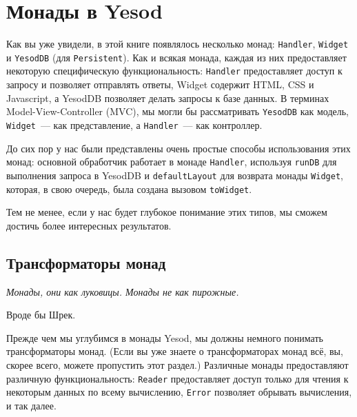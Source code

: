 \chapter{Монады в Yesod}\label{chap:yesod_monads}

Как вы уже увидели, в этой книге появлялось несколько монад: \lstinline'Handler',
\lstinline'Widget' и \lstinline'YesodDB'
(для \lstinline'Persistent'). Как и всякая монада, каждая из них предоставляет некоторую
специфическую функциональность: \lstinline'Handler' предоставляет доступ к запросу и
позволяет
отправлять ответы, Widget содержит HTML, CSS и Javascript, а YesodDB позволяет делать
запросы к базе данных. В терминах Model-View-Controller (MVC), мы могли бы рассматривать
\lstinline'YesodDB' как модель, \lstinline'Widget'~--- как представление, а
\lstinline'Handler'~--- как контроллер.

До сих пор у нас были представлены очень простые способы использования этих монад: 
основной обработчик работает в монаде \lstinline'Handler', используя \lstinline'runDB' для
выполнения запроса в YesodDB и \lstinline'defaultLayout' для возврата монады
\lstinline'Widget', которая, в свою очередь, была создана
вызовом \lstinline'toWidget'.

Тем не менее, если у нас будет глубокое понимание этих типов, мы сможем достичь более интересных результатов.

\section{Трансформаторы монад}

\vspace{1em}\hfill{}\begin{minipage}{150pt}{\begin{spacing}{0.9}
\small\noindent\textit{Монады, они как луковицы. Монады не как пирожные.}\end{spacing}
\vspace{1em}
\hfill{}{Вроде бы Шрек.}}\vspace{2em}
\end{minipage}

Прежде чем мы углубимся в монады Yesod, мы должны немного понимать трансформаторы монад. 
(Если вы уже знаете о трансформаторах монад всё, вы, скорее всего, можете пропустить этот
раздел.) Различные монады предоставляют различную функциональность: \lstinline'Reader'
предоставляет доступ только для чтения к некоторым данных по всему вычислению,
\lstinline'Error' позволяет обрывать вычисления, и так далее.

